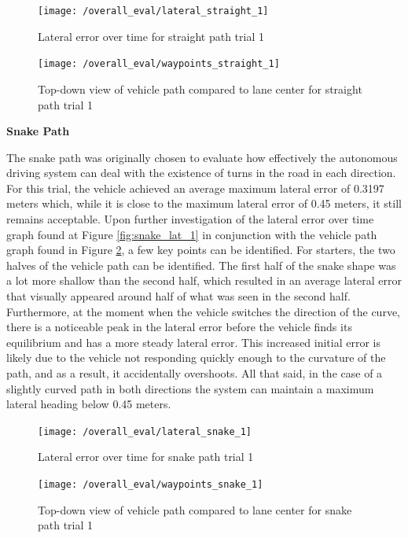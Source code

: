 \documentclass[titlepage, draft]{article}
\begin{document}
{\begin{figure}
	\centering
	\begin{minipage}{.45\textwidth}
		\centering
		\texttt{[image: /overall\_eval/lateral\_straight\_1]}
		\caption{Lateral error over time for straight path trial 1}
		\label{fig:straight_lat_1}
	\end{minipage}%
	\hspace{0.1\textwidth}%
	\begin{minipage}{.45\textwidth}
		\centering
		\texttt{[image: /overall\_eval/waypoints\_straight\_1]}
		\caption{Top-down view of vehicle path compared to lane center for straight path trial 1}
		\label{fig:straight_way_1}
	\end{minipage}
\end{figure}

\textbf{Snake Path}

The snake path was originally chosen to evaluate how effectively the autonomous driving system can deal with the existence of turns in the road in each direction. For this trial, the vehicle achieved an average maximum lateral error of 0.3197 meters which, while it is close to the maximum lateral error of 0.45 meters, it still remains acceptable. Upon further investigation of the lateral error over time graph found at Figure \ref{fig:snake_lat_1} in conjunction with the vehicle path graph found in Figure \ref{fig:snake_way_1}, a few key points can be identified. For starters, the two halves of the vehicle path can be identified. The first half of the snake shape was a lot more shallow than the second half, which resulted in an average lateral error that visually appeared around half of what was seen in the second half. Furthermore, at the moment when the vehicle switches the direction of the curve, there is a noticeable peak in the lateral error before the vehicle finds its equilibrium and has a more steady lateral error. This increased initial error is likely due to the vehicle not responding quickly enough to the curvature of the path, and as a result, it accidentally overshoots. All that said, in the case of a slightly curved path in both directions the system can maintain a maximum lateral heading below 0.45 meters.\\

\begin{figure}
	\centering
	\begin{minipage}{.45\textwidth}
		\centering
		\texttt{[image: /overall\_eval/lateral\_snake\_1]}
		\caption{Lateral error over time for snake path trial 1}
		\label{fig:snake_lat_1}
	\end{minipage}%
	\hspace{0.1\textwidth}%
	\begin{minipage}{.45\textwidth}
		\centering
		\texttt{[image: /overall\_eval/waypoints\_snake\_1]}
		\caption{Top-down view of vehicle path compared to lane center for snake path trial 1}
		\label{fig:snake_way_1}
	\end{minipage}
\end{figure}

}
\end{document}
